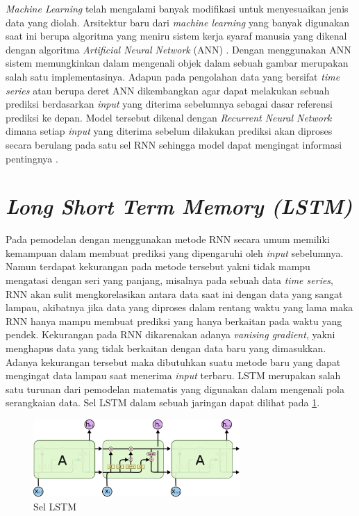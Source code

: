 \textit{Machine Learning} telah mengalami banyak modifikasi untuk menyesuaikan jenis data yang diolah.  Arsitektur baru dari \textit{machine learning} yang banyak digunakan saat ini berupa algoritma yang meniru sistem kerja syaraf manusia yang dikenal dengan algoritma \textit{Artificial Neural Network} (ANN) \cite{braspenning1995artificial}. Dengan menggunakan ANN sistem memungkinkan dalam mengenali objek dalam sebuah gambar merupakan salah satu implementasinya. Adapun pada pengolahan data yang bersifat \textit{time series} atau berupa deret ANN dikembangkan agar dapat melakukan sebuah prediksi berdasarkan \textit{input} yang diterima sebelumnya sebagai dasar referensi prediksi ke depan. Model tersebut dikenal dengan \textit{Recurrent Neural Network} dimana setiap \textit{input} yang diterima sebelum dilakukan prediksi akan diproses secara berulang pada satu sel RNN sehingga model dapat mengingat informasi pentingnya \cite{medsker2001recurrent}.


\section{\textit{Long Short Term Memory (LSTM)}}
Pada pemodelan dengan menggunakan metode RNN secara umum memiliki kemampuan dalam membuat prediksi yang dipengaruhi oleh \textit{input} sebelumnya. Namun terdapat kekurangan pada metode tersebut yakni tidak mampu mengatasi dengan  seri yang panjang, misalnya pada sebuah data \textit{time series}, RNN akan sulit mengkorelasikan antara data saat ini dengan data yang sangat lampau, akibatnya jika data yang diproses dalam rentang waktu yang lama maka RNN hanya mampu membuat prediksi yang hanya berkaitan pada waktu yang pendek. Kekurangan pada RNN dikarenakan adanya \textit{vanising gradient}, yakni menghapus data yang tidak berkaitan dengan data baru yang dimasukkan. Adanya kekurangan tersebut maka dibutuhkan suatu metode baru yang dapat mengingat data lampau saat menerima \textit{input} terbaru. LSTM merupakan salah satu turunan dari pemodelan matematis yang digunakan dalam mengenali pola serangkaian data. Sel LSTM dalam sebuah jaringan dapat dilihat pada \ref{gambar:sel LSTM}.
\begin{figure}[h]
	\begin{center}
		\includegraphics[width=0.7\textwidth]{BAB-2/figures/LSTM3-chain.png}	
		\caption{Sel LSTM \cite{olah2015understanding}}
		\label{gambar:sel LSTM}
	\end{center}
\end{figure}

